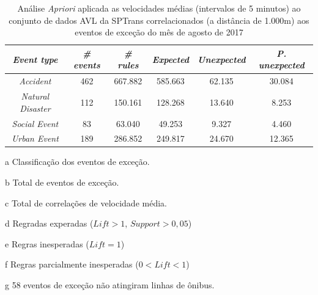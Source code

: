 \documentclass[
	12pt,				%
	oneside,			%
	a4paper,			%
	english,			%
	brazil				%
	]{abntex2ppgsi}
\begin{document}
\begin{apendicesenv}
\begin{table}[!htb]
\centering
\begin{threeparttable}
\caption {Análise \textit{Apriori} aplicada as velocidades médias (intervalos de 5 minutos) ao conjunto de dados AVL da SPTrans correlacionados (a distância de 1.000m) aos eventos de exceção do mês de agosto de 2017}
\label {tab:aprioriFull}
\begin{tabular}{c|c|c|c|c|c}
\hline
\textbf{\textit{Event type}}\tnote{a} & \textbf{\textit{\# events}}\tnote{b} & \textit{\textbf{\# rules}}\tnote{c} & \textbf{\textit{Expected}}\tnote{d} & \textbf{\textit{Unexpected}}\tnote{e} & \textbf{\textit{P. unexpected}}\tnote{f}   \\
\hline
\textit{Accident} & 462 &  667.882 & 585.663 & 62.135 & 30.084\\
\textit{Natural Disaster} & 112 & 150.161 & 128.268  & 13.640 & 8.253\\
\textit{Social Event} & 83 & 63.040 & 49.253 & 9.327 & 4.460	  \\
\textit{Urban Event} & 189 & 286.852 & 249.817 & 24.670 & 12.365 \\
\hline
\end{tabular}
\begin{tablenotes}
            \item[a] Classificação dos eventos de exceção.
            \item[b] Total de eventos de exceção.
            \item[c] Total de correlações de velocidade média.
            \item[d] Regradas experadas ($Lift > 1$, $Support > 0,05$)
            \item[e] Regras inesperadas ($Lift = 1$)
            \item[f] Regras parcialmente inesperadas ($0 < Lift < 1$)
            \item[g] 58 eventos de exceção não atingiram linhas de ônibus.
        \end{tablenotes}
\end{threeparttable}
\end{table}


\end{apendicesenv}
\end{document}
